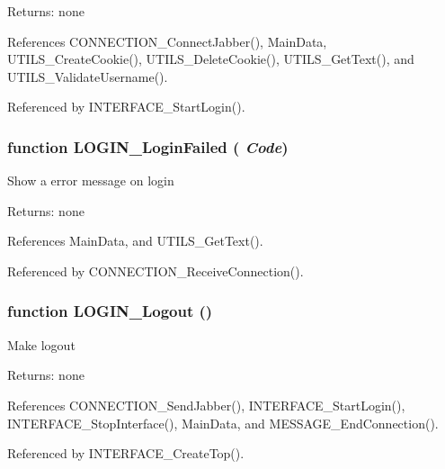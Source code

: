 \begin{Desc}
\item[Returns:]none \end{Desc}


References CONNECTION\_\-ConnectJabber(), MainData, UTILS\_\-CreateCookie(), UTILS\_\-DeleteCookie(), UTILS\_\-GetText(), and UTILS\_\-ValidateUsername().

Referenced by INTERFACE\_\-StartLogin().
\subsubsection{\setlength{\rightskip}{0pt plus 5cm}function LOGIN\_\-LoginFailed ( {\em Code})}\label{login_2login_8js_1591a7d0a9422689275ecbea07995dc5}


Show a error message on login

\begin{Desc}
\item[Returns:]none \end{Desc}


References MainData, and UTILS\_\-GetText().

Referenced by CONNECTION\_\-ReceiveConnection().
\subsubsection{\setlength{\rightskip}{0pt plus 5cm}function LOGIN\_\-Logout ()}\label{login_2login_8js_99309ad6248506daca001f0118fc922f}


Make logout

\begin{Desc}
\item[Returns:]none \end{Desc}


References CONNECTION\_\-SendJabber(), INTERFACE\_\-StartLogin(), INTERFACE\_\-StopInterface(), MainData, and MESSAGE\_\-EndConnection().

Referenced by INTERFACE\_\-CreateTop().
